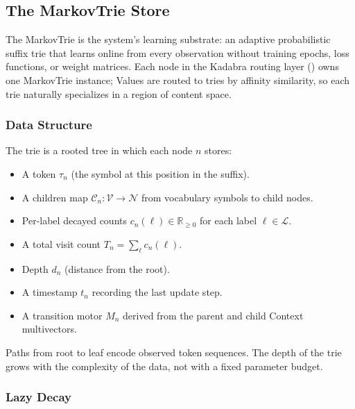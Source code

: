 \subsection{The MarkovTrie Store}
\label{sec:markovtrie}

The MarkovTrie is the system's learning substrate: an adaptive
probabilistic suffix trie that learns online from every observation
without training epochs, loss functions, or weight matrices.  Each node
in the Kadabra routing layer () owns one
MarkovTrie instance; Values are routed to tries by affinity similarity,
so each trie naturally specializes in a region of content space.

\subsubsection{Data Structure}

The trie is a rooted tree in which each node $n$ stores:
\begin{itemize}[nosep]
  \item A token $\tau_n$ (the symbol at this position in the suffix).
  \item A children map $\mathcal{C}_n : \mathcal{V} \to \mathcal{N}$
        from vocabulary symbols to child nodes.
  \item Per-label decayed counts
        $c_n(\ell) \in \mathbb{R}_{\geq 0}$ for each label
        $\ell \in \mathcal{L}$.
  \item A total visit count
        $T_n = \sum_{\ell} c_n(\ell)$.
  \item Depth $d_n$ (distance from the root).
  \item A timestamp $t_n$ recording the last update step.
  \item A transition motor $M_n$ derived from the parent and child
        Context multivectors.
\end{itemize}

Paths from root to leaf encode observed token sequences.  The depth of
the trie grows with the complexity of the data, not with a fixed
parameter budget.

\subsubsection{Lazy Decay}


